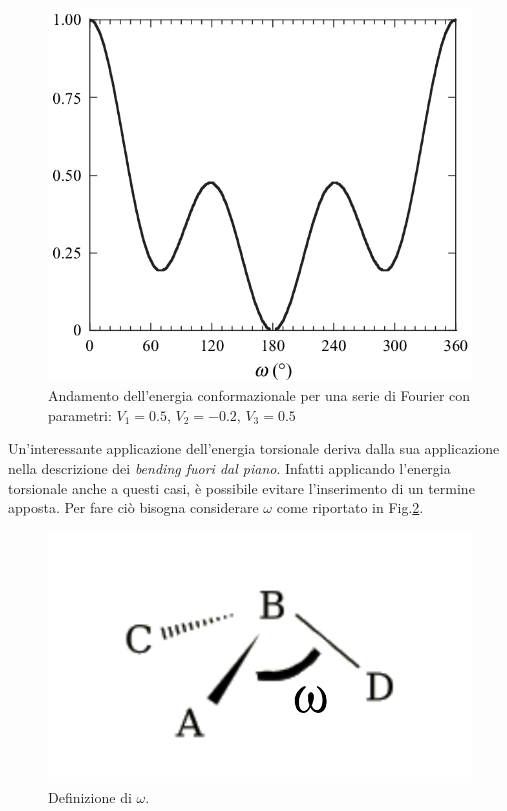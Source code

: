\documentclass[oneside]{amsbook}
\numberwithin{section}{chapter}
\numberwithin{equation}{section}
\numberwithin{figure}{section}
\begin{document}
\begin{figure} [H]
\label{conf}
\centering
\caption{Andamento dell'energia conformazionale per una serie di Fourier con parametri: $V_1=0.5$, $V_2=-0.2$, $V_3=0.5$}
\includegraphics[scale=0.4]{conf}
\end{figure}

Un'interessante applicazione dell'energia torsionale deriva dalla sua applicazione nella descrizione dei \emph{bending fuori dal piano}. Infatti applicando l'energia torsionale anche a questi casi, è possibile evitare l'inserimento di un termine apposta. Per fare ciò bisogna considerare $\omega$ come riportato in Fig.\ref{omconf}.

\begin{figure} [H]
\label{omconf}
\centering
\caption{Definizione di $\omega$.}
\includegraphics[scale=0.2]{omconf}
\end{figure}
\end{document}
